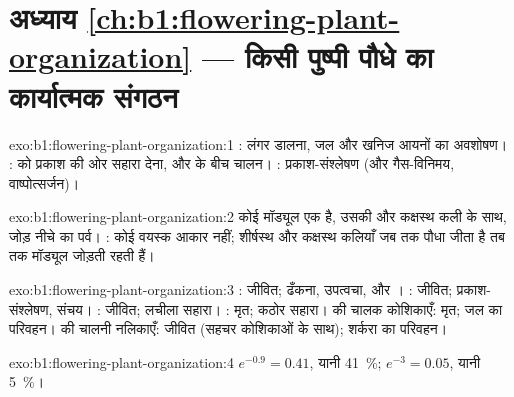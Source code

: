 \section*{अध्याय \ref{ch:b1:flowering-plant-organization} --- किसी पुष्पी पौधे का कार्यात्मक संगठन}

\begin{solution}{exo:b1:flowering-plant-organization:1}
: लंगर डालना, जल और खनिज आयनों का अवशोषण। :  को प्रकाश की
ओर सहारा देना,  और  के बीच चालन।
: प्रकाश-संश्लेषण (और गैस-विनिमय, वाष्पोत्सर्जन)।
\end{solution}

\begin{solution}{exo:b1:flowering-plant-organization:2}
कोई मॉड्यूल एक  है, उसकी  और कक्षस्थ कली के साथ, जोड़ नीचे का
पर्व। : कोई वयस्क आकार नहीं; शीर्षस्थ और कक्षस्थ कलियाँ
जब तक पौधा जीता है तब तक मॉड्यूल जोड़ती रहती हैं।
\end{solution}

\begin{solution}{exo:b1:flowering-plant-organization:3}
: जीवित; ढँकना, उपत्वचा,  और । :
जीवित; प्रकाश-संश्लेषण, संचय। : जीवित; लचीला सहारा।
: मृत; कठोर सहारा।  की चालक कोशिकाएँ: मृत; जल का
परिवहन।  की चालनी नलिकाएँ: जीवित (सहचर कोशिकाओं के साथ); शर्करा का
परिवहन।
\end{solution}

\begin{solution}{exo:b1:flowering-plant-organization:4}
$e^{-0.9} = 0.41$, यानी \qty{41}{\%}; $e^{-3} = 0.05$, यानी
\qty{5}{\%}।
\end{solution}

